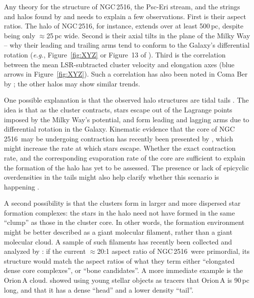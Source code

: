 \documentclass[12pt,twocolumn,tighten]{aastex63}
\newcommand{\cn}{NGC\,2516} %
\begin{document}
Any theory for the structure of \cn, the Psc-Eri stream, and the
strings and halos found by  and
 needs to explain a few observations.  First
is their aspect ratios.  The halo of \cn, for instance, extends over
at least 500\,pc, despite being only $\approx$25\,pc wide.  Second is
their axial tilts in the plane of the Milky Way -- why their leading
and trailing arms tend to conform to the Galaxy's differential
rotation ({\it e.g.}, Figure~\ref{fig:XYZ} or Figure~13 of
).  Third is the correlation between the
mean LSR-subtracted cluster velocity and elongation axes (blue arrows
in Figure~\ref{fig:XYZ}).  Such a correlation has also been noted in
Coma Ber by \citet{tang_comaber_2019}; the other halos may show
similar trends.

One possible explanation is that the observed halo structures are
tidal tails \citep[{\it e.g.},][]{krumholz_star_2019}. The idea is
that as the cluster contracts, stars escape out of the Lagrange points
imposed by the Milky Way's potential, and form leading and lagging
arms due to differential rotation in the Galaxy.  Kinematic evidence
that the core of \cn\ may be undergoing contraction has recently been
presented by \citet{healy_stellar_2020}, which might increase the rate
at which stars escape.  Whether the exact contraction rate, and the
corresponding evaporation rate of the core are sufficient to
explain the formation of the halo has yet to be assessed.  The
presence or lack of epicyclic overdensities in the tails might also
help clarify whether this scenario is happening
\citep{kupper_more_2012}.

A second possibility is that the clusters form in larger and more
dispersed star formation complexes: the stars in the halo need not
have formed in the same ``clump'' as those in the cluster core.  In
other words, the formation environment might be better described as a
giant molecular filament, rather than a giant molecular cloud.  A
sample of such filaments has recently been collected and analyzed by
\citet{zucker_physical_2018}: if the current $\approx$20:1 aspect
ratio of \cn\ were primordial, its structure would match the aspect
ratios of what they term either ``elongated dense core complexes'', or
``bone candidates''.  A more immediate example is the Orion\,A cloud.
\citet{grosschedl_3d_2018} showed using young stellar objects as
tracers that Orion\,A is 90\,pc long, and that it has a dense ``head''
and a lower density ``tail''.
\end{document}
